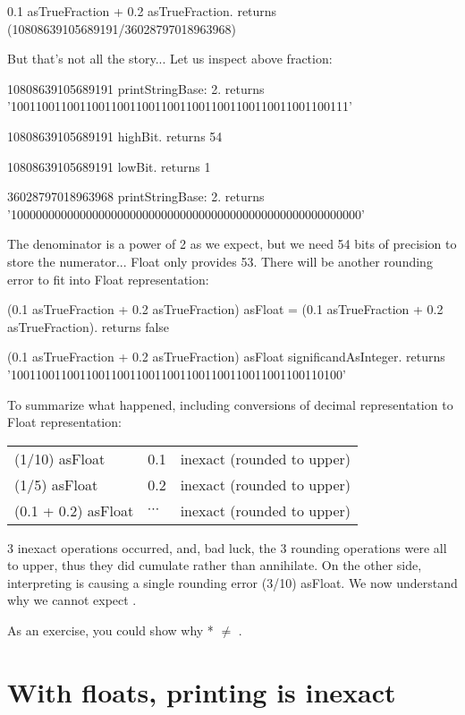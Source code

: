 \documentclass[a4paper,10pt,twoside]{book}
\begin{document}
 \begin{code}{}
0.1 asTrueFraction + 0.2 asTrueFraction.
	returns  (10808639105689191/36028797018963968)
\end{code}

But that's not all the story... Let us inspect above fraction:
 \begin{code}{}
10808639105689191 printStringBase: 2.
	returns  '100110011001100110011001100110011001100110011001100111'
	
10808639105689191 highBit.
	returns  54
	
10808639105689191 lowBit.
	returns  1

36028797018963968 printStringBase: 2.
	returns  '10000000000000000000000000000000000000000000000000000000'
\end{code}

The denominator is a power of 2 as we expect, but we need 54 bits of precision to store the numerator... Float only provides 53. There will be another rounding error to fit into Float representation:

\begin{code}{}
(0.1 asTrueFraction + 0.2 asTrueFraction) asFloat = (0.1 asTrueFraction + 0.2 asTrueFraction).
	returns false
	
(0.1 asTrueFraction + 0.2 asTrueFraction) asFloat significandAsInteger.
	returns '10011001100110011001100110011001100110011001100110100'
\end{code}

To summarize what happened, including conversions of decimal representation to Float representation:\\
\begin{tabular}{lll}
(1/10) asFloat & 0.1 & inexact (rounded to upper) \\
(1/5) asFloat & 0.2 & inexact (rounded to upper) \\
(0.1 + 0.2) asFloat & $\cdots$ & inexact (rounded to upper)  \\
\end{tabular}

3 inexact operations occurred, and, bad luck, the 3 rounding operations were all to upper, thus they did cumulate rather than annihilate.
On the other side, interpreting  is causing a single rounding error (3/10) asFloat.
We now understand why we cannot expect .

As an exercise, you could show why  *   $\neq$ .


\section{With floats, printing is inexact}
\end{document}
